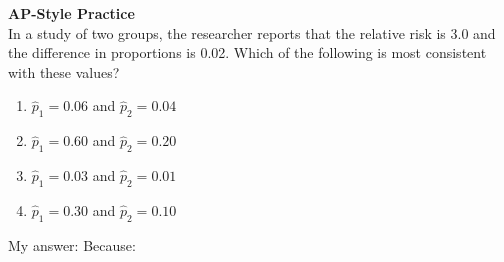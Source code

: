 \documentclass[10pt]{article}
\begin{document}
\vspace{0.18in}

\begin{tcolorbox}[colback=redbg, colframe=redacc, boxrule=0.8pt, arc=2mm,
    left=4mm, right=4mm, top=3mm, bottom=3mm]
\small\textbf{AP-Style Practice}\\[6pt]
In a study of two groups, the researcher reports that the relative risk is 3.0 and the
difference in proportions is 0.02. Which of the following is most consistent with these values?

\vspace{10pt}
\begin{enumerate}[label=\textbf{(\Alph*)}, leftmargin=2em, itemsep=6pt]
  \item $\hat{p}_1 = 0.06$ and $\hat{p}_2 = 0.04$
  \item $\hat{p}_1 = 0.60$ and $\hat{p}_2 = 0.20$
  \item $\hat{p}_1 = 0.03$ and $\hat{p}_2 = 0.01$
  \item $\hat{p}_1 = 0.30$ and $\hat{p}_2 = 0.10$
\end{enumerate}
\end{tcolorbox}

\vspace{0.1in}
\noindent\textcolor{slate}{\small My answer: \blank{1cm} \quad Because: \blank{8.5cm}}
\end{document}
